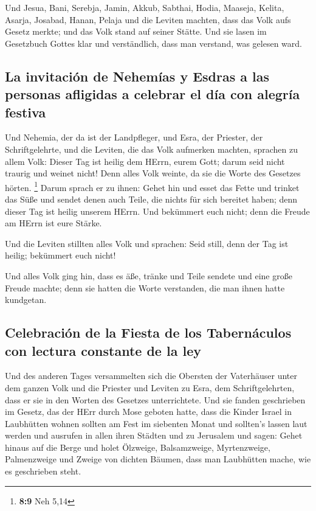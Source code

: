  Und Jesua, Bani, Serebja, Jamin, Akkub, Sabthai, Hodia,
Maaseja, Kelita, Asarja, Josabad, Hanan, Pelaja und die Leviten machten,
dass das Volk aufs Gesetz merkte; und das Volk stand auf seiner Stätte.
 Und sie lasen im Gesetzbuch Gottes klar und verständlich,
dass man verstand, was gelesen ward.

\hypertarget{la-invitaciuxf3n-de-nehemuxedas-y-esdras-a-las-personas-afligidas-a-celebrar-el-duxeda-con-alegruxeda-festiva}{%
\subsection{La invitación de Nehemías y Esdras a las personas afligidas
a celebrar el día con alegría
festiva}\label{la-invitaciuxf3n-de-nehemuxedas-y-esdras-a-las-personas-afligidas-a-celebrar-el-duxeda-con-alegruxeda-festiva}}

 Und Nehemia, der da ist der Landpfleger, und Esra, der
Priester, der Schriftgelehrte, und die Leviten, die das Volk aufmerken
machten, sprachen zu allem Volk: Dieser Tag ist heilig dem HErrn, eurem
Gott; darum seid nicht traurig und weinet nicht! Denn alles Volk weinte,
da sie die Worte des Gesetzes hörten. \footnote{\textbf{8:9} Neh 5,14}
 Darum sprach er zu ihnen: Gehet hin und esset das Fette
und trinket das Süße und sendet denen auch Teile, die nichts für sich
bereitet haben; denn dieser Tag ist heilig unserem HErrn. Und bekümmert
euch nicht; denn die Freude am HErrn ist eure Stärke.

 Und die Leviten stillten alles Volk und sprachen: Seid
still, denn der Tag ist heilig; bekümmert euch nicht!

 Und alles Volk ging hin, dass es äße, tränke und Teile
sendete und eine große Freude machte; denn sie hatten die Worte
verstanden, die man ihnen hatte kundgetan.

\hypertarget{celebraciuxf3n-de-la-fiesta-de-los-tabernuxe1culos-con-lectura-constante-de-la-ley}{%
\subsection{Celebración de la Fiesta de los Tabernáculos con lectura
constante de la
ley}\label{celebraciuxf3n-de-la-fiesta-de-los-tabernuxe1culos-con-lectura-constante-de-la-ley}}

 Und des anderen Tages versammelten sich die Obersten der
Vaterhäuser unter dem ganzen Volk und die Priester und Leviten zu Esra,
dem Schriftgelehrten, dass er sie in den Worten des Gesetzes
unterrichtete.  Und sie fanden geschrieben im Gesetz, das
der HErr durch Mose geboten hatte, dass die Kinder Israel in Laubhütten
wohnen sollten am Fest im siebenten Monat  und sollten's
lassen laut werden und ausrufen in allen ihren Städten und zu Jerusalem
und sagen: Gehet hinaus auf die Berge und holet Ölzweige, Balsamzweige,
Myrtenzweige, Palmenzweige und Zweige von dichten Bäumen, dass man
Laubhütten mache, wie es geschrieben steht.

